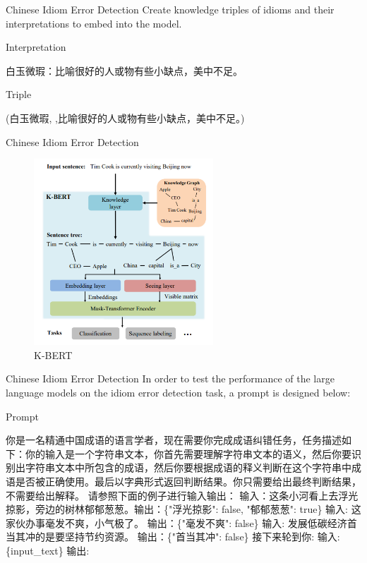\documentclass[10pt]{beamer}
\begin{document}
\begin{frame}{Chinese Idiom Error Detection}
Create knowledge triples of idioms and their interpretations to embed into the model.
\begin{exampleblock}{Interpretation}
\begin{CJK}{UTF8}{gbsn}
白玉微瑕：比喻很好的人或物有些小缺点，美中不足。
\end{CJK}
\end{exampleblock}
\begin{alertblock}{Triple}
\begin{CJK}{UTF8}{gbsn}
(白玉微瑕, ,比喻很好的人或物有些小缺点，美中不足。)
\end{CJK}
\end{alertblock}
\end{frame}

\begin{frame}{Chinese Idiom Error Detection}
\begin{figure}
\centering
\includegraphics[width=0.6\textwidth]{pic/KBERT.png}
\caption{K-BERT\cite{KBERT}}
\label{fig:my_label}
\end{figure}
\end{frame}

\begin{frame}{Chinese Idiom Error Detection}
In order to test the performance of the large language models on the idiom error detection task, a prompt is designed below:
\begin{alertblock}{Prompt}
\begin{CJK}{UTF8}{gbsn}
你是一名精通中国成语的语言学者，现在需要你完成成语纠错任务，任务描述如下：你的输入是一个字符串文本，你首先需要理解字符串文本的语义，然后你要识别出字符串文本中所包含的成语，然后你要根据成语的释义判断在这个字符串中成语是否被正确使用。最后以字典形式返回判断结果。你只需要给出最终判断结果，不需要给出解释。
请参照下面的例子进行输入输出：
输入：这条小河看上去浮光掠影，旁边的树林郁郁葱葱。输出：\{"浮光掠影": false, "郁郁葱葱": true\}
输入: 这家伙办事毫发不爽，小气极了。 输出：\{"毫发不爽": false\}
输入: 发展低碳经济首当其冲的是要坚持节约资源。 输出：\{"首当其冲": false\}
接下来轮到你:
输入: \{input\_text\} 输出:
\end{CJK}
\end{alertblock}
\end{frame}
\end{document}
